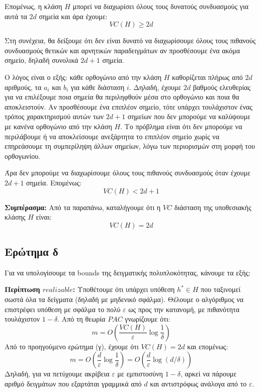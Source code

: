 \documentclass[12pt]{article}
\begin{document}
Επομένως, η κλάση $H$ μπορεί να διαχωρίσει όλους τους δυνατούς συνδυασμούς για αυτά τα $2d$ σημεία και άρα έχουμε:
\[
VC(H) \geq 2d
\]

\vspace{1em}
Στη συνέχεια, θα δείξουμε ότι δεν είναι δυνατό να διαχωρίσουμε όλους τους πιθανούς συνδυασμούς θετικών και αρνητικών παραδειγμάτων αν προσθέσουμε ένα ακόμα σημείο, δηλαδή συνολικά $2d + 1$ σημεία.

Ο λόγος είναι ο εξής: κάθε ορθογώνιο από την κλάση $H$ καθορίζεται πλήρως από $2d$ αριθμούς, τα $a_i$ και $b_i$ για κάθε διάσταση $i$. Δηλαδή, έχουμε $2d$ βαθμούς ελευθερίας για να επιλέξουμε ποια σημεία θα περιληφθούν μέσα στο ορθογώνιο και ποια θα αποκλειστούν. Αν προσθέσουμε ένα επιπλέον σημείο, τότε υπάρχει τουλάχιστον ένας τρόπος χαρακτηρισμού αυτών των $2d + 1$ σημείων που δεν μπορούμε να καλύψουμε με κανένα ορθογώνιο από την κλάση $H$. Το πρόβλημα είναι ότι δεν μπορούμε να περιλάβουμε ή να αποκλείσουμε ανεξάρτητα το επιπλέον σημείο χωρίς να επηρεάσουμε τη συμπερίληψη άλλων σημείων, λόγω των περιορισμών στη μορφή του ορθογωνίου.

Άρα δεν μπορούμε να διαχωρίσουμε όλους τους πιθανούς συνδυασμούς όταν έχουμε $2d + 1$ σημεία. Επομένως:
\[
VC(H) < 2d + 1
\]

\vspace{0.5em}
\noindent\textbf{Συμπέρασμα:} Από τα παραπάνω, καταλήγουμε ότι η $VC$ διάσταση της υποθεσιακής κλάσης $H$ είναι:
\[
VC(H) = 2d
\]

\subsection*{Ερώτημα δ}

Για να υπολογίσουμε τα bounds της δειγματικής πολυπλοκότητας, κάνουμε τα εξής:

\vspace{0.5em}
\textbf{Περίπτωση $realizable$:}
Υποθέτουμε ότι υπάρχει υπόθεση $h^* \in H$ που ταξινομεί σωστά όλα τα δείγματα (δηλαδή με μηδενικό σφάλμα). Θέλουμε ο αλγόριθμος να επιστρέφει υπόθεση με σφάλμα το πολύ $\varepsilon$ ως προς την κατανομή, με πιθανότητα τουλάχιστον $1 - \delta$. Από τη θεωρία $PAC$ γνωρίζουμε ότι:
\[
m = O\left( \frac{VC(H)}{\varepsilon} \log \frac{1}{\delta} \right)
\]
Από το προηγούμενο ερώτημα (γ), έχουμε ότι $VC(H) = 2d$  και επομένως:
\[
m = O\left( \frac{d}{\varepsilon} \log \frac{1}{\delta} \right) = O\left( \frac{d}{\varepsilon} \log(d/\delta) \right)
\]
Δηλαδή, για να πετύχουμε ακρίβεια $\varepsilon$ με εμπιστοσύνη $1 - \delta$, αρκεί να πάρουμε αριθμό δειγμάτων που εξαρτάται γραμμικά από $d$ και αντιστρόφως ανάλογα από το $\varepsilon$.
\end{document}
